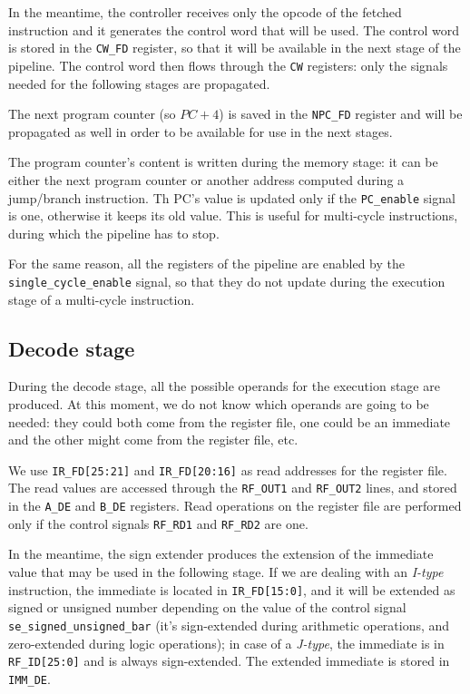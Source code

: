 In the meantime, the controller receives only the opcode of the fetched instruction and it generates the control word that will be used.
The control word is stored in the \texttt{CW\_FD} register, so that it will be available in the next stage of the pipeline. 
The control word then flows through the \texttt{CW} registers: only the signals needed for the following stages are propagated.

The next program counter (so $PC + 4$) is saved in the \texttt{NPC\_FD} register and will be propagated as well in order to be available for use in the next stages.

The program counter's content is written during the memory stage: it can be either the next program counter or another address computed during a jump/branch instruction. 
Th PC's value is updated only if the \texttt{PC\_enable} signal is one, otherwise it keeps its old value. 
This is useful for multi-cycle instructions, during which the pipeline has to stop. 

For the same reason, all the registers of the pipeline are enabled by the \texttt{single\_cycle\_enable} signal, so that they do not update during the execution stage of a multi-cycle instruction.

\subsection{Decode stage}

During the decode stage, all the possible operands for the execution stage are produced.
At this moment, we do not know which operands are going to be needed: they could both come from the register file, one could be an immediate and the other might come from the register file, etc.

We use \texttt{IR\_FD[25:21]} and \texttt{IR\_FD[20:16]} as read addresses for the register file. 
The read values are accessed through the \texttt{RF\_OUT1} and \texttt{RF\_OUT2} lines, and stored in the \texttt{A\_DE} and \texttt{B\_DE} registers.
Read operations on the register file are performed only if the control signals \texttt{RF\_RD1} and \texttt{RF\_RD2} are one. 

In the meantime, the sign extender produces the extension of the immediate value that may be used in the following stage. 
If we are dealing with an \textit{I-type} instruction, the immediate is located in \texttt{IR\_FD[15:0]}, and it will be extended as signed or unsigned number depending on the value of the control signal \texttt{se\_signed\_unsigned\_bar} (it's sign-extended during arithmetic operations, and zero-extended during logic operations); in case of a \textit{J-type}, the immediate is in \texttt{RF\_ID[25:0]} and is always sign-extended.
The extended immediate is stored in \texttt{IMM\_DE}.

